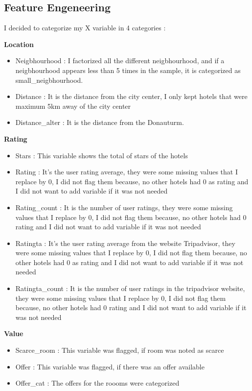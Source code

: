 \documentclass[
]{article}
\begin{document}
\hypertarget{feature-engeneering}{%
\subsection{Feature Engeneering}\label{feature-engeneering}}

I decided to categorize my X variable in 4 categories :

\textbf{Location}

\begin{itemize}
\item
  Neigbhourhood : I factorized all the different neigbhourhood, and if a
  neigbhourhood appears less than 5 times in the sample, it is
  categorized as small\_neigbhourhood.
\item
  Distance : It is the distance from the city center, I only kept hotels
  that were maximum 5km away of the city center
\item
  Distance\_alter : It is the distance from the Donauturm.
\end{itemize}

\textbf{Rating}

\begin{itemize}
\item
  Stars : This variable shows the total of stars of the hotels
\item
  Rating : It's the user rating average, they were some missing values
  that I replace by 0, I did not flag them because, no other hotels had
  0 as rating and I did not want to add variable if it was not needed
\item
  Rating\_count : It is the number of user ratings, they were some
  missing values that I replace by 0, I did not flag them because, no
  other hotels had 0 rating and I did not want to add variable if it was
  not needed
\item
  Ratingta : It's the user rating average from the website Tripadvisor,
  they were some missing values that I replace by 0, I did not flag them
  because, no other hotels had 0 as rating and I did not want to add
  variable if it was not needed
\item
  Ratingta\_count : It is the number of user ratings in the tripadvisor
  website, they were some missing values that I replace by 0, I did not
  flag them because, no other hotels had 0 rating and I did not want to
  add variable if it was not needed
\end{itemize}

\textbf{Value}

\begin{itemize}
\item
  Scarce\_room : This variable was flagged, if room was noted as scarce
\item
  Offer : This variable was flagged, if there was an offer available
\item
  Offer\_cat : The offers for the roooms were categorized
\end{itemize}
\end{document}
